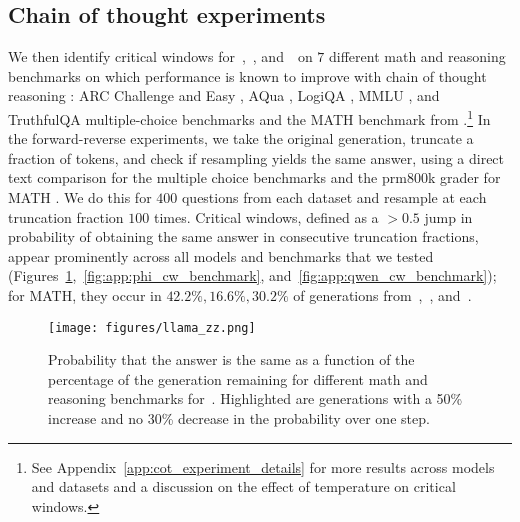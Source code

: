 \subsection{Chain of thought experiments}\label{sec:cot_experiments}
 We then identify critical windows for~\llamainstruct,~\phiinstruct, and~\qweninstruct~on $7$ different math and reasoning benchmarks on which performance is known to improve with chain of thought reasoning \citep{lanham2023measuringfaithfulnesschainofthoughtreasoning}: ARC Challenge and Easy \citep{clark2018think}, AQua \citep{ling2017program}, LogiQA \citep{liu2020logiqa}, MMLU \citep{hendrycks2021measuring}, and TruthfulQA \citep{lin2022truthfulqa} multiple-choice benchmarks and the MATH benchmark from \citep{hendrycksmath2021}.\footnote{See Appendix~\ref{app:cot_experiment_details} for more results across models and datasets and a discussion on the effect of temperature on critical windows.} In the forward-reverse experiments, we take the original generation, truncate a fraction of tokens, and check if resampling yields the same answer, using a direct text comparison for the multiple choice benchmarks and the prm800k grader for MATH \citep{lightman2023lets}. We do this for $400$ questions from each dataset and resample at each truncation fraction $100$ times. Critical windows, defined as a $>0.5$ jump in probability of obtaining the same answer in consecutive truncation fractions, appear prominently across all models and benchmarks that we tested (Figures~\ref{fig:app:llama_cw_benchmark},~\ref{fig:app:phi_cw_benchmark}, and~\ref{fig:app:qwen_cw_benchmark}); for MATH, they occur in $42.2\%,16.6\%,30.2\%$ of generations from~\llamainstruct,~\qweninstruct, and~\phiinstruct. 

  \begin{figure}[H] 
    \centering
    \texttt{[image: figures/llama\_zz.png]}
    \caption{Probability that the answer is the same as a function of the percentage of the generation remaining for different math and reasoning benchmarks for~\llamainstruct. Highlighted are generations with a 50\% increase and no 30\% decrease in the probability over one step. }
    \label{fig:app:llama_cw_benchmark}
\end{figure}
 
